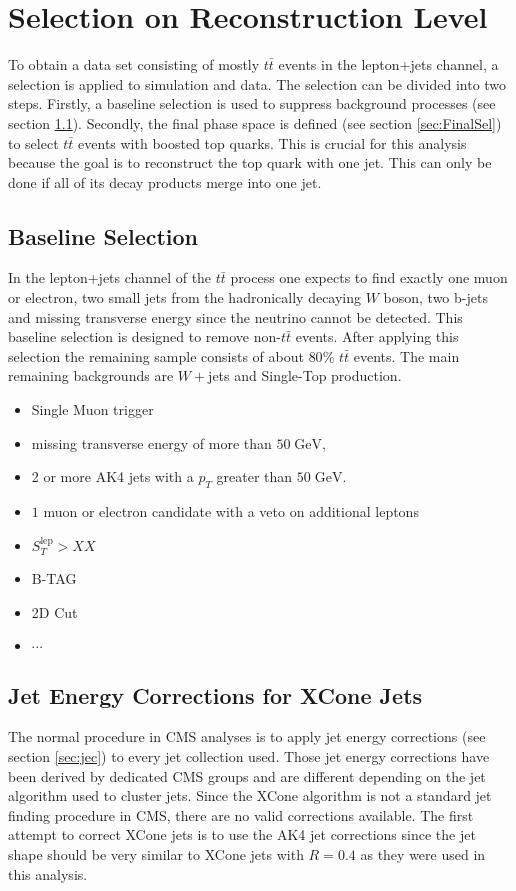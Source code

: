 \section{Selection on Reconstruction Level}
\label{sec:selection}
	To obtain a data set consisting of mostly $t\bar{t}$ events in the lepton+jets channel, a selection is applied to simulation and data. The selection can be divided into two steps. Firstly, a baseline selection is used to suppress background processes (see section \ref{sec:PreSel}). Secondly, the final phase space is defined (see section \ref{sec:FinalSel}) to select $t\bar{t}$ events with boosted top quarks. This is crucial for this analysis because the goal is to reconstruct the top quark with one jet. This can only be done if all of its decay products merge into one jet.
\subsection{Baseline Selection}
\label{sec:PreSel}
	In the lepton+jets channel of the $t\bar{t}$ process one expects to find exactly one muon or electron, two small jets from the hadronically decaying $W$ boson, two b-jets and missing transverse energy since the neutrino cannot be detected. This baseline selection is designed to remove non-$t\bar{t}$ events. After applying this selection the remaining sample consists of about $80\%$ $t\bar{t}$ events. The main remaining backgrounds are $W+$jets and Single-Top production. 
	\begin{itemize}
	\item Single Muon trigger 
	\item missing transverse energy of more than $50\;\text{GeV}$,
	\item 2 or more AK4 jets with a $p_T$ greater than $50\;\text{GeV}$.
	\item $1$ muon or electron candidate with a veto on additional leptons
	\item $S_T^\text{lep} > XX$
	\item B-TAG
	\item 2D Cut
	\item $\cdots$	
	\end{itemize}
	
\subsection{Jet Energy Corrections for XCone Jets} 
	The normal procedure in CMS analyses is to apply jet energy corrections (see section \ref{sec:jec}) to every jet collection used. Those jet energy corrections have been derived by dedicated CMS groups and are different depending on the jet algorithm used to cluster jets. Since the XCone algorithm is not a standard jet finding procedure in CMS, there are no valid corrections available. The first attempt to correct XCone jets is to use the AK4 jet corrections since the jet shape should be very similar to XCone jets with $R=0.4$ as they were used in this analysis.
	
